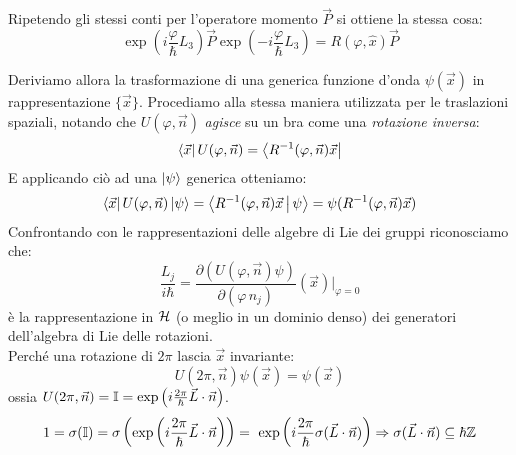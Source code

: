\documentclass[../../FisicaTeorica.tex]{subfiles}
\begin{document}
Ripetendo gli stessi conti per l'operatore momento $\vec{P}$ si ottiene la stessa cosa:
\[
\exp\left(i\frac{\varphi}{\hbar}L_3\right)\vec{P}\exp\left(-i\frac{\varphi}{\hbar}L_3\right)=R(\varphi, \hat{x})\vec{P}
\]

Deriviamo allora la trasformazione di una generica funzione d'onda $\psi(\vec{x})$ in rappresentazione $\{\vec{x}\}$. Procediamo alla stessa maniera utilizzata per le traslazioni spaziali, notando che $U(\varphi,\vec{n})$ \textit{agisce}  su un bra come una \textit{rotazione inversa}:
\[
\Bra{\vec{x}} U(\varphi, \vec{n}) = \Bra{R^{-1}(\varphi, \vec{n}) \vec{x}}
\]
E applicando ciò ad una $\Ket{\psi}$ generica otteniamo:
\[
\Bra{\vec{x}}U(\varphi, \vec{n})\Ket{\psi}=\Braket{R^{-1}(\varphi, \vec{n})\vec{x}|\psi}=\psi(R^{-1}(\varphi, \vec{n}) \vec{x})
\]
Confrontando con le rappresentazioni delle algebre di Lie dei gruppi riconosciamo che:
\[
\frac{L_j}{i\hbar} = \frac{\partial(U(\varphi, \vec{n})\psi)}{\partial(\varphi \,n_j)}(\vec{x})\Big|_{\varphi=0}
\] %
è la rappresentazione in $\mathcal{H}$ (o meglio in un dominio denso) dei generatori dell'algebra di Lie delle rotazioni. %
\\Perché una rotazione di $2\pi$ lascia $\vec{x}$ invariante:
\[
U(2\pi, \vec{n})\psi(\vec{x})=\psi(\vec{x})
\]
ossia $U(2\pi, \vec{n})=\mathbb{I} = \exp\left(i\frac{2\pi}{\hbar}\vec{L}\cdot \vec{n}\right)$.
\[
1=\sigma(\bb{I}) = \sigma\left(\exp\left(i\frac{2\pi}{\hbar}\vec{L}\cdot \vec{n}\right)\right) =\ \exp\left(i\frac{2\pi}{\hbar}\sigma(\vec{L}\cdot \vec{n})\right)\Rightarrow \sigma(\vec{L}\cdot \vec{n}) \subseteq \hbar \bb{Z}
\]
\end{document}
